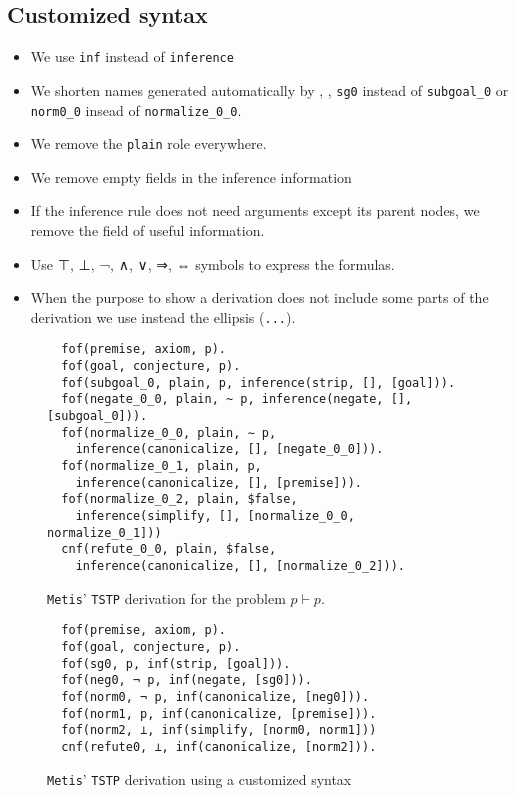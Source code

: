 \documentclass[../main.tex]{subfiles}
\begin{document}
\begin{subappendices}
\section{Customized \TSTP syntax}
\label{app:tstp-syntax}


\begin{itemize}
  \item We use \verb!inf! instead of \verb!inference!
  \item We shorten names generated automatically by \Metis, \eg,
\verb!sg0! instead of \verb!subgoal_0! or \verb!norm0_0!
insead of \verb!normalize_0_0!.
  \item We remove the \verb!plain! role everywhere.
  \item We remove empty fields in the inference information
  \item If the inference rule does not need arguments except its parent nodes, we remove the field of useful information.
  \item Use ⊤, ⊥, ¬, ∧, ∨, ⇒, ⇔ symbols to express the formulas.
  \item When the purpose to show a \TSTP derivation does not include
  some parts of the derivation we use instead the ellipsis (\verb!...!).
\end{itemize}


\begin{figure}
\begin{verbatim}
  fof(premise, axiom, p).
  fof(goal, conjecture, p).
  fof(subgoal_0, plain, p, inference(strip, [], [goal])).
  fof(negate_0_0, plain, ~ p, inference(negate, [], [subgoal_0])).
  fof(normalize_0_0, plain, ∼ p,
    inference(canonicalize, [], [negate_0_0])).
  fof(normalize_0_1, plain, p,
    inference(canonicalize, [], [premise])).
  fof(normalize_0_2, plain, $false,
    inference(simplify, [], [normalize_0_0, normalize_0_1]))
  cnf(refute_0_0, plain, $false,
    inference(canonicalize, [], [normalize_0_2])).
\end{verbatim}
\caption{\texttt{Metis}' \texttt{TSTP} derivation for the
problem $p\vdash p$.}
\label{fig:metis-proof-tstp}
\end{figure}

\begin{figure}
\begin{verbatim}
  fof(premise, axiom, p).
  fof(goal, conjecture, p).
  fof(sg0, p, inf(strip, [goal])).
  fof(neg0, ¬ p, inf(negate, [sg0])).
  fof(norm0, ¬ p, inf(canonicalize, [neg0])).
  fof(norm1, p, inf(canonicalize, [premise])).
  fof(norm2, ⊥, inf(simplify, [norm0, norm1]))
  cnf(refute0, ⊥, inf(canonicalize, [norm2])).
\end{verbatim}
\caption{\texttt{Metis}' \texttt{TSTP} derivation using a customized syntax}
\label{fig:metis-proof-tstp-customized}
\end{figure}


\end{subappendices}
\end{document}
